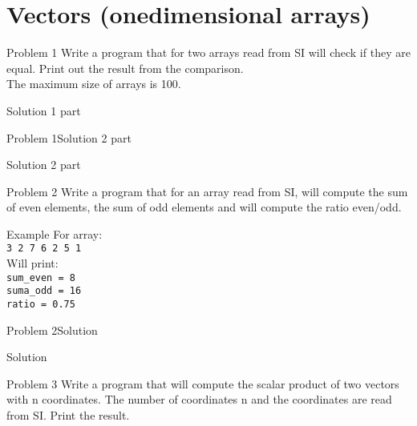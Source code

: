 
\section{Vectors (onedimensional arrays)}

\begin{frame}[fragile]{Problem 1}
Write a program that for two arrays read from SI will check if they are equal.
Print out the result from the comparison. \\
The maximum size of arrays is 100.
\pause
\begin{exampleblock}{Solution 1 part}

\end{exampleblock}
\end{frame}

\begin{frame}[fragile]{Problem 1}{Solution 2 part}
\begin{exampleblock}{Solution 2 part}

\end{exampleblock}
\end{frame}


\begin{frame}{Problem 2}
Write a program that for an array read from SI, will compute the sum of even
elements, the sum of odd elements and will compute the ratio even/odd.
\begin{exampleblock}{Example}
For array:\\
\texttt{3 {\color{red}2} 7 {\color{red}6} {\color{red}2} 5 1}\\
Will print: \\
\texttt{sum\_even = 8}\\
\texttt{suma\_odd = 16}\\
\texttt{ratio = 0.75}
\end{exampleblock}
\end{frame}

\begin{frame}[fragile]{Problem 2}{Solution} 
\begin{exampleblock}{Solution}

\end{exampleblock}
\end{frame}

\begin{frame}{Problem 3}
Write a program that will compute the scalar product of two vectors with n
coordinates. The number of coordinates n and the coordinates are read from SI.
Print the result.
\end{frame}

